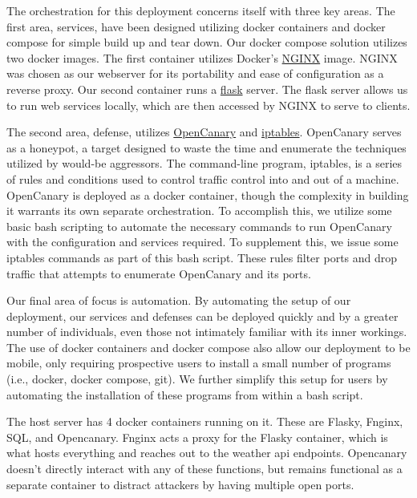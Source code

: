 The orchestration for this deployment concerns itself with three key areas. The first area, services, 
have been designed utilizing docker containers and docker compose for simple build up and tear down. 
Our docker compose solution utilizes two docker images. The first container utilizes Docker's \hyperlink{https://nginx.org/en/}{NGINX}
image. NGINX was chosen as our webserver for its portability and ease of configuration as a reverse proxy.
Our second container runs a \hyperlink{https://flask.palletsprojects.com/en/3.0.x/}{flask} server. 
The flask server allows us to run web services locally, which are then accessed by NGINX to serve to clients.

The second area, defense, utilizes \hyperlink{https://opencanary.readthedocs.io/en/latest/}{OpenCanary} 
and \hyperlink{https://www.redhat.com/sysadmin/iptables}{iptables}. OpenCanary serves as a honeypot, a target 
designed to waste the time and enumerate the techniques utilized by would-be aggressors. The command-line program, 
iptables, is a series of rules and conditions used to control traffic control into and out of a machine. OpenCanary 
is deployed as a docker container, though the complexity in building it warrants its own separate orchestration. To accomplish this, we utilize some basic bash scripting to automate the necessary commands to run OpenCanary with the configuration and 
services required. To supplement this, we issue some iptables commands as part of this bash script. These rules filter ports and 
drop traffic that attempts to enumerate OpenCanary and its ports. 

Our final area of focus is automation. By automating the setup of our deployment, our services and defenses can be deployed quickly and by a greater number of individuals, even those not intimately familiar with its inner workings. 
The use of docker containers and docker compose also allow our deployment to be mobile, only requiring 
prospective users to install a small number of programs (i.e., docker, docker compose, git). We further simplify this 
setup for users by automating the installation of these programs from within a bash script.

The host server has 4 docker containers running on it. These are Flasky, Fnginx, SQL, and Opencanary. Fnginx acts a proxy for the Flasky container, which is what hosts everything and reaches out to the weather api endpoints. Opencanary doesn't directly interact with any of these functions, but remains functional as a separate container to distract attackers by having multiple open ports.

